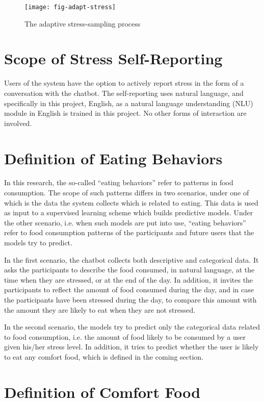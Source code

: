 \begin{figure}[ht]
  \caption{The adaptive stress-sampling process}
  \label{fig:adapt-stress}
  \centering
  \texttt{[image: fig-adapt-stress]}
\end{figure}

\section{Scope of Stress Self-Reporting}

Users of the system have the option to actively report stress in the form of a conversation with the chatbot. The self-reporting uses natural language, and specifically in this project, English, as a natural language understanding (NLU) module in English is trained in this project. No other forms of interaction are involved.

\section{Definition of Eating Behaviors}

In this research, the so-called “eating behaviors” refer to patterns in food consumption. The scope of such patterns differs in two scenarios, under one of which is the data the system collects which is related to eating. This data is used as input to a supervised learning scheme which builds predictive models. Under the other scenario, i.e. when such models are put into use, “eating behaviors” refer to food consumption patterns of the participants and future users that the models try to predict.

In the first scenario, the chatbot collects both descriptive and categorical data. It asks the participants to describe the food consumed, in natural language, at the time when they are stressed, or at the end of the day. In addition, it invites the participants to reflect the amount of food consumed during the day, and in case the participants have been stressed during the day, to compare this amount with the amount they are likely to eat when they are not stressed.

In the second scenario, the models try to predict only the categorical data related to food consumption, i.e. the amount of food likely to be consumed by a user given his/her stress level. In addition, it tries to predict whether the user is likely to eat any comfort food, which is defined in the coming section.

\section{Definition of Comfort Food}

